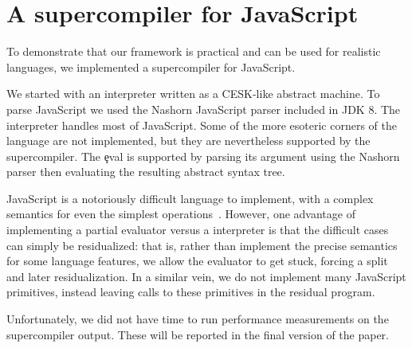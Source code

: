 
\section{A supercompiler for JavaScript}
\label{sec:js}

To demonstrate that our framework is practical and can be used for 
realistic languages, we implemented a supercompiler for JavaScript.

We started with an interpreter written as a CESK-like abstract machine.
To parse JavaScript we 
used the Nashorn JavaScript parser included in JDK 8.
The interpreter handles most of JavaScript.
Some of the more esoteric corners of the language are not implemented, but
they are nevertheless supported by the supercompiler.
The \c{eval} is supported by parsing its argument
using the Nashorn parser
then evaluating the resulting abstract syntax tree.

JavaScript is a notoriously difficult language to implement, with a complex
semantics for even the simplest operations~\cite{ecma,lambda-js}. However, one advantage of
implementing a partial evaluator versus a interpreter is that the difficult
cases can simply be residualized: that is, rather than implement the precise semantics
for some language features, we allow the evaluator to get stuck, forcing a split and later
residualization. In a similar vein, we do not implement many JavaScript primitives,
instead leaving calls to these primitives in the residual program.

Unfortunately, we did not have time to 
run performance measurements on the supercompiler output.
These will be reported in the final version of the paper.

